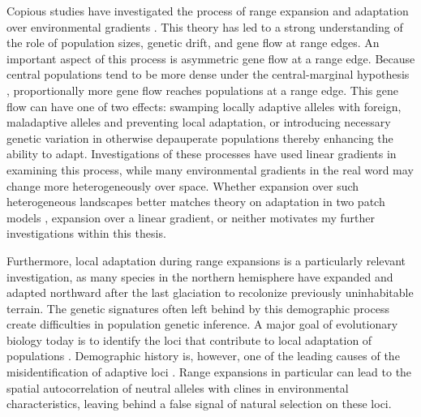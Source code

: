 Copious studies have investigated the process of range expansion and adaptation over environmental gradients \citep{Kirkpatrick:1997, Barton:2001, Bridle:2010, Polechova:2015, GarciaRamos:1997}. This theory has led to a strong understanding of the role of population sizes, genetic drift, and gene flow at range edges. An important aspect of this process is asymmetric gene flow at a range edge. Because central populations tend to be more dense under the central-marginal hypothesis \citep{Brown:1984, Eckert:2008}, proportionally more gene flow reaches populations at a range edge. This gene flow can have one of two effects: swamping locally adaptive alleles with foreign, maladaptive alleles and preventing local adaptation, or introducing necessary genetic variation in otherwise depauperate populations thereby enhancing the ability to adapt. Investigations of these processes have used linear gradients in examining this process, while many environmental gradients in the real word may change more heterogeneously over space. Whether expansion over such heterogeneous landscapes better matches theory on adaptation in two patch models \citep{Gomulkiewicz:1995, Ronce:2001, Holt:1997, Gomulkiewicz:1999}, expansion over a linear gradient, or neither motivates my further investigations within this thesis.

Furthermore, local adaptation during range expansions is a particularly relevant investigation, as many species in the northern hemisphere have expanded and adapted northward after the last glaciation to recolonize previously uninhabitable terrain. The genetic signatures often left behind by this demographic process create difficulties in population genetic inference. A major goal of evolutionary biology today is to identify the loci that contribute to local adaptation of populations \citep{Savolainen:2013, Whitlock:2015, LeCorre:2012, Coop:2010}. Demographic history is, however, one of the leading causes of the misidentification of adaptive loci \citep{Whitlock:2015}. Range expansions in particular can lead to the spatial autocorrelation of neutral alleles with clines in environmental characteristics, leaving behind a false signal of natural selection on these loci.

